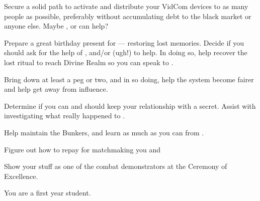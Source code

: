 \documentclass[char]{GL2020}
\begin{document}
\begin{itemz}
    \item Secure a solid path to activate and distribute your VidCom devices to as many people as possible, preferably without accumulating debt to the black market or anyone else. Maybe \cAssistantScientist{}, or \cChupInventor{} can help?
    \item Prepare a great birthday present for \cDisney{} — restoring \cDisney{\their} lost memories. Decide if you should ask for the help of \cWildCard{}, and/or \cPirateChild{} (ugh!) to help. In doing so, help \cDisney{} recover the lost ritual to reach Divine Realm so you can speak to \cTechGod{}.
    \item Bring down \cAntiChup{} at least a peg or two, and in so doing, help the system become fairer and help \cScholarship{} get away from \cAntiChup{\their} influence. 
    \item Determine if you can and should keep your relationship with \cWarlordDaughter{} a secret. Assist \cWarlordDaughter{\them} with investigating what really happened to \cLoud{}.
\end{itemz}

\begin{itemz}
    \item Help \cBunker{} maintain the Bunkers, and learn as much as you can from \cBunker{\them}.
    \item Figure out how to repay \cInitiate{} for matchmaking you and \cWarlordDaughter{}
    \item Show your stuff as one of the combat demonstrators at the Ceremony of Excellence.
\end{itemz}

\begin{itemz}[Notes]
    \item You are a first year student.
\end{itemz}
\end{document}
